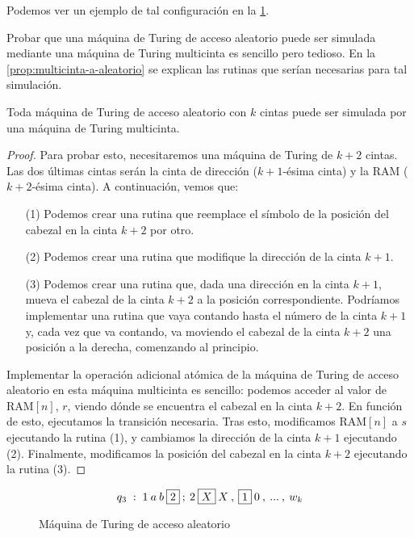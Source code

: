 Podemos ver un ejemplo de tal configuración en la \cref{fig:maquina-turing-aleatorio}.

Probar que una máquina de Turing de acceso aleatorio puede ser simulada mediante una máquina de Turing multicinta es sencillo pero tedioso. En la \cref{prop:multicinta-a-aleatorio} se explican las rutinas que serían necesarias para tal simulación.

\begin{proposicion}\label{prop:multicinta-a-aleatorio}
Toda máquina de Turing de acceso aleatorio con $k$ cintas puede ser simulada por una máquina de Turing multicinta.
\end{proposicion}
\begin{proof}
Para probar esto, necesitaremos una máquina de Turing de $k+2$ cintas. Las dos últimas cintas serán la cinta de dirección ($k+1$-ésima cinta) y la RAM ($k+2$-ésima cinta). A continuación, vemos que:

\begin{itemize}
    \item[(1)] Podemos crear una rutina que reemplace el símbolo de la posición del cabezal en la cinta $k+2$ por otro.
    \item[(2)] Podemos crear una rutina que modifique la dirección de la cinta $k+1$.
    \item[(3)] Podemos crear una rutina que, dada una dirección en la cinta $k+1$, mueva el cabezal de la cinta $k+2$ a la posición correspondiente. Podríamos implementar una rutina que vaya contando hasta el número de la cinta $k+1$ y, cada vez que va contando, va moviendo el cabezal de la cinta $k+2$ una posición a la derecha, comenzando al principio.
\end{itemize}
Implementar la operación adicional atómica de la máquina de Turing de acceso aleatorio en esta máquina multicinta es sencillo: podemos acceder al valor de $\text{RAM}[n]$, $r$, viendo dónde se encuentra el cabezal en la cinta $k+2$. En función de esto, ejecutamos la transición necesaria. Tras esto, modificamos $\text{RAM}[n]$ a $s$ ejecutando la rutina (1), y cambiamos la dirección de la cinta $k+1$ ejecutando (2). Finalmente, modificamos la posición del cabezal en la cinta $k+2$ ejecutando la rutina (3). 
\end{proof}

\begin{figure}[H]
\centering
$$q_3\;:\;1\:a\:b\:\fbox{$2$}\:;\:2\:\fbox{$X$}\:X\:,\:\fbox{$1$}\:0\:,\:...\:,\:w_k$$

\caption{Máquina de Turing de acceso aleatorio}
\label{fig:maquina-turing-aleatorio}
\end{figure}

